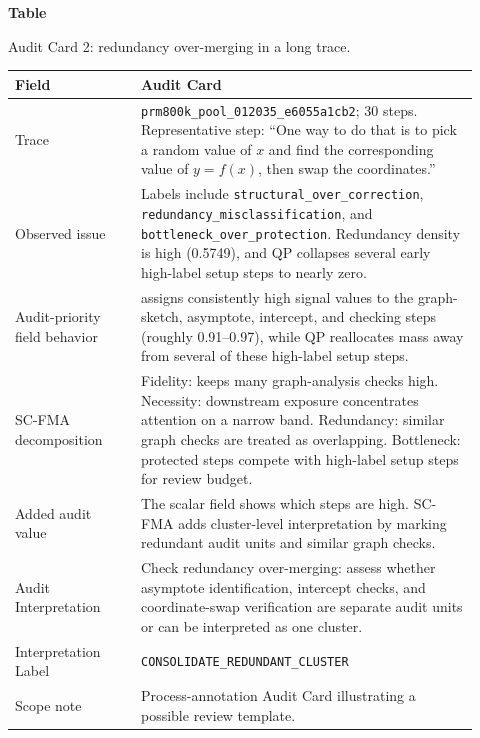 \clearpage
\par\medskip
{}\label{tab:audit-card-redundancy}
\noindent\textbf{Table~\thetable}\par
\noindent Audit Card 2: redundancy over-merging in a long trace.
\begin{center}
\small
\renewcommand{\arraystretch}{1.08}
\begin{tabular}{p{0.25\linewidth}p{0.67\linewidth}}
\toprule
\textbf{Field} & \textbf{Audit Card} \\
\midrule
Trace & \texttt{prm800k\_pool\_012035\_e6055a1cb2}; 30 steps. Representative step: ``One way to do that is to pick a random value of $x$ and find the corresponding value of $y=f(x)$, then swap the coordinates.'' \\
Observed issue & Labels include \texttt{structural\_over\_correction}, \texttt{redundancy\_misclassification}, and \texttt{bottleneck\_over\_protection}. Redundancy density is high (0.5749), and QP collapses several early high-label setup steps to nearly zero. \\
Audit-priority field behavior & \wstruct{} assigns consistently high signal values to the graph-sketch, asymptote, intercept, and checking steps (roughly 0.91--0.97), while QP reallocates mass away from several of these high-label setup steps. \\
SC-FMA decomposition & Fidelity: \wstruct{} keeps many graph-analysis checks high. Necessity: downstream exposure concentrates attention on a narrow band. Redundancy: similar graph checks are treated as overlapping. Bottleneck: protected steps compete with high-label setup steps for review budget. \\
Added audit value & The scalar field shows which steps are high. SC-FMA adds cluster-level interpretation by marking redundant audit units and similar graph checks. \\
Audit Interpretation & Check redundancy over-merging: assess whether asymptote identification, intercept checks, and coordinate-swap verification are separate audit units or can be interpreted as one cluster. \\
Interpretation Label & \texttt{CONSOLIDATE\_REDUNDANT\_CLUSTER} \\
Scope note & Process-annotation Audit Card illustrating a possible review template. \\
\bottomrule
\end{tabular}
\end{center}
\medskip

